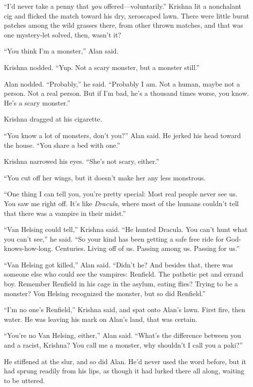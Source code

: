 ``I'd never take a penny that \textit{you} offered---voluntarily.''
Krishna lit a nonchalant cig and flicked the match toward his dry,
xeroscaped lawn.  There were little burnt patches among the wild
grasses there, from other thrown matches, and that was one mystery-let
solved, then, wasn't it?

``You think I'm a monster,'' Alan said.

Krishna nodded.  ``Yup.  Not a scary monster, but a monster still.''

Alan nodded.  ``Probably,'' he said.  ``Probably I am.  Not a human,
maybe not a person.  Not a real person.  But if I'm bad, he's a
thousand times worse, you know.  He's a scary monster.''

Krishna dragged at his cigarette.

``You know a lot of monsters, don't you?'' Alan said.  He jerked his
head toward the house.  ``You share a bed with one.''

Krishna narrowed his eyes.  ``She's not scary, either.''

``You cut off her wings, but it doesn't make her any less monstrous.

``One thing I can tell you, you're pretty special:  Most real people
never see us.  You saw me right off.  It's like \textit{Dracula},
where most of the humans couldn't tell that there was a vampire in
their midst.''

``Van Helsing could tell,'' Krishna said.  ``He hunted Dracula.  You
can't hunt what you can't see,'' he said.  ``So your kind has been
getting a safe free ride for God-knows-how-long.  Centuries.  Living
off of us.  Passing among us.  Passing for us.''

``Van Helsing got killed,'' Alan said.  ``Didn't he?  And besides
that, there was someone else who could see the vampires:  Renfield. 
The pathetic pet and errand boy.  Remember Renfield in his cage in the
asylum, eating flies?  Trying to be a monster?  Von Helsing recognized
the monster, but so did Renfield.''

``I'm no one's Renfield,'' Krishna said, and spat onto Alan's lawn. 
First fire, then water.  He was leaving his mark on Alan's land, that
was certain.

``You're no Van Helsing, either,'' Alan said.  ``What's the difference
between you and a racist, Krishna?  You call me a monster, why
shouldn't I call you a paki?''

He stiffened at the slur, and so did Alan.  He'd never used the word
before, but it had sprung readily from his lips, as though it had
lurked there all along, waiting to be uttered.

